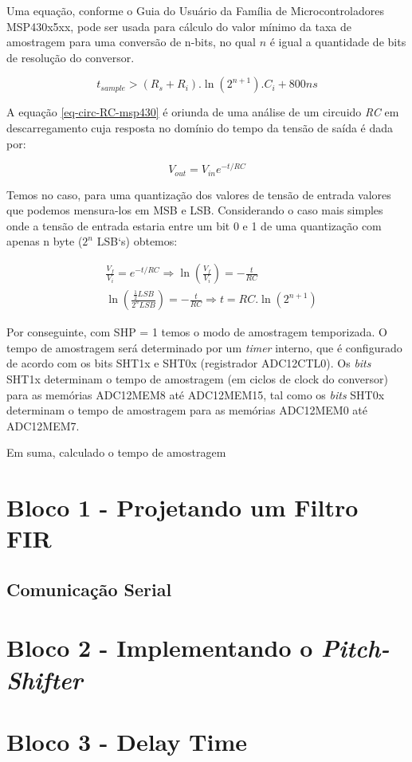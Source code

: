 			Uma equação, conforme o Guia do Usuário da Família de Microcontroladores MSP430x5xx, pode ser usada para cálculo do valor mínimo da taxa de amostragem para uma conversão de n-bits, no qual $ n $ é igual a quantidade de bits de resolução do conversor.
			
			\begin{equation}
				t_{sample} > (R_s + R_i) . \ln(2^{n+1}). C_i + 800ns
				\label{eq-circ-RC-msp430}
			\end{equation}
			
			A equação \ref{eq-circ-RC-msp430}  é oriunda de uma análise de um circuido \textit{RC} em descarregamento cuja resposta no domínio do tempo da tensão de saída é dada por:
			
			\begin{equation*}
				V_{out} = V_{in}e^{-t/{RC}}
			\end{equation*}
			
			Temos no caso, para uma quantização dos valores de tensão de entrada valores que podemos mensura-los em MSB e LSB. Considerando o caso mais simples onde a tensão de entrada estaria entre um bit 0 e 1 de uma quantização com apenas n byte ($ 2^n $ LSB`s) obtemos:
			
			\begin{equation}
				\begin{aligned}
						&\frac{V_f}{V_i} = e^{-t/{RC}}\Rightarrow \ln\left(\frac{V_f}{V_i}\right) = -\frac{t}{RC}\\
					&\ln\left(\frac{\frac{1}{2}LSB}{2^n LSB}\right) = -\frac{t}{RC}\Rightarrow \boxed{t = RC.\ln(2^{n+1})}
				\end{aligned}
			\end{equation}

			
			Por conseguinte, com SHP = 1 temos o modo de amostragem temporizada. O tempo de amostragem será determinado por um \textit{timer} interno, que é configurado de acordo com os bits SHT1x e SHT0x (registrador ADC12CTL0). Os \textit{bits} SHT1x determinam o tempo de amostragem (em ciclos de clock do conversor) para as memórias ADC12MEM8 até ADC12MEM15, tal como os \textit{bits} SHT0x determinam o tempo de amostragem para as memórias ADC12MEM0 até ADC12MEM7.
			
			Em suma, calculado o tempo de amostragem 
		
		
		
		
	
\section{Bloco 1 - Projetando um Filtro FIR}
	\subsection{Comunicação Serial}
		
\section{Bloco 2 - Implementando o \textit{Pitch-Shifter}}

\section{Bloco 3 - Delay Time}